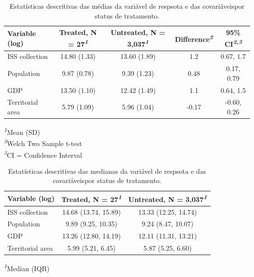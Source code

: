 \documentclass[12pt, a4paper, twoside]{article}
\numberwithin{equation}{subsection} %
\begin{document}
\hypertarget{tbl-descriptive-mean}{}
\begingroup
\fontsize{9.0pt}{10.8pt}\selectfont
\setlength{\LTpost}{0mm}
\begin{longtable}{lcccc}
\caption{\label{tbl-descriptive-mean}Estatísticas descritivas das médias da variável de respsota e das
covariáveispor status de tratamento. }\tabularnewline

\toprule
\textbf{Variable (log)} & \textbf{Treated}, N = 27\textsuperscript{\textit{1}} & \textbf{Untreated}, N = 3,037\textsuperscript{\textit{1}} & \textbf{Difference}\textsuperscript{\textit{2}} & \textbf{95\% CI}\textsuperscript{\textit{2,3}} \\ 
\midrule\addlinespace[2.5pt]
ISS collection & 14.80 (1.33) & 13.60 (1.89) & 1.2 & 0.67, 1.7 \\ 
Population & 9.87 (0.78) & 9.39 (1.23) & 0.48 & 0.17, 0.79 \\ 
GDP & 13.50 (1.10) & 12.42 (1.49) & 1.1 & 0.64, 1.5 \\ 
Territorial area & 5.79 (1.09) & 5.96 (1.04) & -0.17 & -0.60, 0.26 \\ 
\bottomrule
\end{longtable}
\begin{minipage}{\linewidth}
\textsuperscript{\textit{1}}Mean (SD)\\
\textsuperscript{\textit{2}}Welch Two Sample t-test\\
\textsuperscript{\textit{3}}CI = Confidence Interval\\
\end{minipage}
\endgroup

\hypertarget{tbl-descriptive-median}{}
\begingroup
\fontsize{9.0pt}{10.8pt}\selectfont
\setlength{\LTpost}{0mm}
\begin{longtable}{lcc}
\caption{\label{tbl-descriptive-median}Estatísticas descritivas das medianas da variável de respsota e das
covariáveispor status de tratamento. }\tabularnewline

\toprule
\textbf{Variable (log)} & \textbf{Treated}, N = 27\textsuperscript{\textit{1}} & \textbf{Untreated}, N = 3,037\textsuperscript{\textit{1}} \\ 
\midrule\addlinespace[2.5pt]
ISS collection & 14.68 (13.74, 15.89) & 13.33 (12.25, 14.74) \\ 
Population & 9.89 (9.25, 10.35) & 9.24 (8.47, 10.07) \\ 
GDP & 13.26 (12.80, 14.19) & 12.11 (11.31, 13.21) \\ 
Territorial area & 5.99 (5.21, 6.45) & 5.87 (5.25, 6.60) \\ 
\bottomrule
\end{longtable}
\begin{minipage}{\linewidth}
\textsuperscript{\textit{1}}Median (IQR)\\
\end{minipage}
\endgroup
\end{document}
